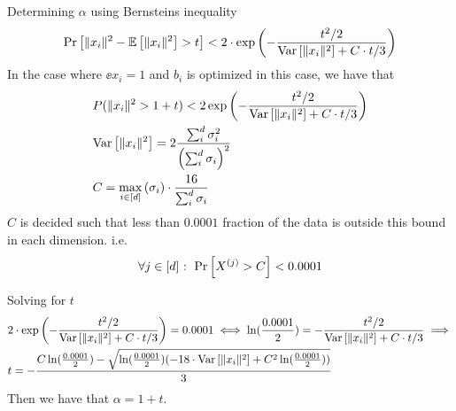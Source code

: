 \documentclass[a4paper,12pt]{article}
\begin{document}
Determining $\alpha$ using Bernsteins inequality
\[
    \Pr\left [\|x_i\|^2 - \mathbb{E} \left [ \| x_i \|^2 \right] > t \right] < 2 \cdot \exp \left (- \frac{t^2/2}{\text{Var} \left [ \|x_i\|^2  \right] + C \cdot t/3}\right)
\]
In the case where $\ee{x_i} = 1$ and $b_i$ is optimized in this case,
we have that
\begin{align*}
    &P(\|x_i\|^2 > 1 + t) < 2 \exp \left (- \frac{t^2/2}{\text{Var} \left [ \|x_i\|^2  \right] + C \cdot t/3}\right) \\
    &\text{Var} \left [ \| x_i \|^2  \right] = 2 \frac{\sum_i^d \sigma_i^2}{\left (\sum_i^d \sigma_i\right)^2} \\
    &C = \max_{i \in [d]} \left (\sigma_i\right) \cdot \frac{16}{\sum_i^d \sigma_i}
\end{align*}
$C$ is decided such that less than $0.0001$ fraction of the data is outside this bound
in each dimension. i.e. 
\[
    \forall j \in [d] \text{ : }\Pr\left [X^{(j)} > C \right] < 0.0001
\]

Solving for $t$
\begin{align*}
&2 \cdot \exp \left (- \frac{t^2/2}{\text{Var} \left [ \|x_i\|^2  \right] + C \cdot t/3}\right) = 0.0001
\iff \ln(\frac{0.0001}{2}) = -\frac{t^2/2}{\text{Var} \left [ \|x_i\|^2  \right] + C \cdot t/3}
\implies \\ &t = - \frac{C \ln(\frac{0.0001}{2}) - 
\sqrt{\ln(\frac{0.0001}{2})(-18 \cdot \text{Var} \left [ \|x_i\|^2  \right] + C^2\ln(\frac{0.0001}{2}))}}{3}
\end{align*}
Then we have that $\alpha = 1 + t$.

\end{document}
